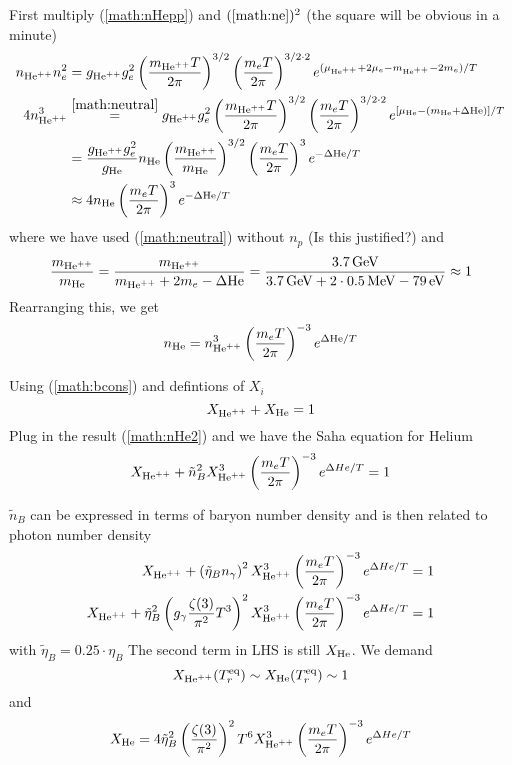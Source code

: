 \begin{enumerate}[label=(\alph*)]
      First multiply (\ref{math:nHepp}) and $(\ref{math:ne})^2$ (the square will be obvious in a minute)
      \begin{align*}
         n_{\text{He}^{++}} n_e^2 &= g_{\text{He}^{++}} g_e^2 \left( \frac{m_{\text{He}^{++}} T}{2\pi} \right)^{3/2} \left( \frac{m_e T}{2\pi} \right)^{3/2 \cdot 2} e^{(\mu_{\text{He}^{++}} + 2 \mu_e - m_{\text{He}^{++}} - 2m_e)/T} \\
         4 n^3_{\text{He}^{++}} &\stackrel{\ref{math:neutral}}{=} g_{\text{He}^{++}} g_e^2 \left( \frac{m_{\text{He}^{++}} T}{2\pi} \right)^{3/2} \left( \frac{m_e T}{2\pi} \right)^{3/2 \cdot 2} e^{[\mu_{\text{He}} - (m_{\text{He}} + \Delta \text{He})]/T} \\
                     &= \frac{g_{\text{He}^{++}} g_e^2}{g_{\text{He}}} n_{\text{He}} \left( \frac{m_{\text{He}^{++}}}{m_{\text{He}}} \right)^{3/2} \left( \frac{m_e T}{2\pi} \right)^3 e^{-\Delta \text{He} /T} \\
                     &\approx 4 n_{\text{He}} \left( \frac{m_e T}{2\pi} \right)^3 e^{-\Delta \text{He} /T}
      \end{align*}
      where we have used (\ref{math:neutral}) without $n_p$ (Is this justified?) and 
      \begin{equation*}
         \frac{m_\Hepp}{m_\He} = \frac{m_\Hepp}{m_\Hepp + 2 m_e - \Delta \He} = \frac{\SI{3.7}{\giga \eV}}{\SI{3.7}{\giga \eV} + 2 \cdot \SI{0.5}{\mega \eV} - \SI{79}{\eV}} \approx 1
      \end{equation*}
      Rearranging this, we get
      \begin{equation}
         n_{\text{He}} =  n^3_{\text{He}^{++}} \left( \frac{m_e T}{2\pi} \right)^{-3} e^{\Delta \text{He} /T} \label{math:nHe2}
      \end{equation}

      Using (\ref{math:bcons}) and defintions of $X_i$
      \begin{equation}
         X_{\text{He}^{++}} + X_{\text{He}} = 1
      \end{equation} 
      Plug in the result (\ref{math:nHe2}) and we have the Saha equation for Helium
      \begin{equation}
         X_{\text{He}^{++}} +  \tilde{n}_B^2 X_{\text{He}^{++}}^3 \left( \frac{m_e T}{2\pi} \right)^{-3} e^{\Delta He/T}= 1
      \end{equation}

      $\tilde{n}_B$ can be expressed in terms of baryon number density and is then related to photon number density
      \begin{align*}
         X_{\text{He}^{++}} +  \left( \tilde{\eta}_B n_\gamma \right)^2 X_{\text{He}^{++}}^3 \left( \frac{m_e T}{2\pi} \right)^{-3} e^{\Delta He/T} &= 1 \\
         X_{\text{He}^{++}} +   \tilde\eta_B^2 \left( g_\gamma \frac{\zeta(3)}{\pi^2} T^3 \right)^2 X_{\text{He}^{++}}^3 \left( \frac{m_e T}{2\pi} \right)^{-3} e^{\Delta He/T} &= 1
      \end{align*}
      with $\tilde{\eta}_B = 0.25 \cdot \eta_B$
      The second term in LHS is still $X_{\text{He}}$. We demand
      \begin{equation}
         X_{\text{He}^{++}}(T^{\text{eq}}_r) \sim X_{\text{He}} (T^{\text{eq}}_r) \sim 1 
      \end{equation}
      and
      \begin{align*}
         X_{\text{He}} = 4 \tilde\eta_B^2 \left(\frac{\zeta(3)}{\pi^2} \right)^2  T^6 X_{\text{He}^{++}}^3 \left( \frac{m_e T}{2\pi} \right)^{-3} e^{\Delta He/T}
      \end{align*}


\end{enumerate}
